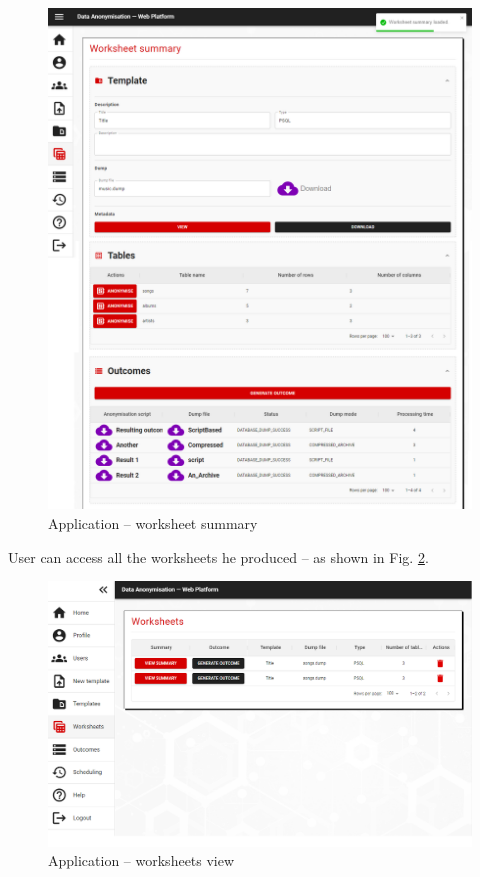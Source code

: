 \documentclass[a4paper,twoside,12pt]{book}
\begin{document}
\begin{figure}
  \centering
  \includegraphics[width=\linewidth]{img/app_worksheet.png}
  \caption{Application -- worksheet summary}
  \label{fig:summary_view}
\end{figure}


User can access all the worksheets he produced -- as shown in Fig. \ref{fig:allworksheetsv}.

\begin{figure}
  \centering
  \includegraphics[width=\linewidth]{img/app_worksheets_view.png}
  \caption{Application -- worksheets view}
  \label{fig:allworksheetsv}
\end{figure}
\end{document}
